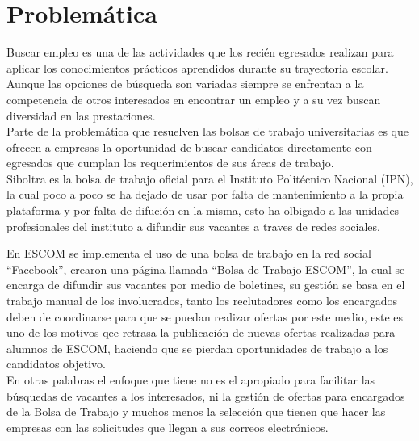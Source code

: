 \clearpage
\section{Problemática}

Buscar empleo es una de las actividades que los recién egresados realizan para aplicar los conocimientos prácticos aprendidos 
durante su trayectoria escolar. Aunque las opciones de búsqueda son variadas siempre se enfrentan a la competencia de otros 
interesados en encontrar un empleo y a su vez buscan diversidad en las prestaciones. \\
Parte de la problemática que resuelven las bolsas de trabajo universitarias es que ofrecen a empresas la oportunidad de buscar 
candidatos directamente con egresados que cumplan los requerimientos de sus áreas de trabajo.\\

\newline
Siboltra es la bolsa de trabajo oficial para el Instituto Politécnico Nacional (IPN), la cual poco a poco se ha dejado de usar
por falta de mantenimiento a la propia plataforma y por falta de difución en la misma, esto ha olbigado a las unidades profesionales
del instituto a difundir sus vacantes a traves de redes sociales.\\
\newline

En ESCOM se implementa el uso de una bolsa de trabajo en la red social ``Facebook'', 
crearon una página llamada ``Bolsa de Trabajo ESCOM'', la cual se encarga de difundir sus vacantes por medio de boletines, su gestión se basa en el trabajo manual de los involucrados, tanto los reclutadores como los encargados deben de coordinarse 
para que se puedan realizar ofertas por este medio, este  es uno de los motivos qee retrasa la publicación de nuevas ofertas 
realizadas para alumnos de ESCOM, haciendo que se pierdan oportunidades de trabajo a los candidatos objetivo.\\
\newline
En otras palabras el enfoque que tiene no es el apropiado para facilitar las búsquedas de  vacantes a los interesados, ni la gestión
de ofertas para encargados de la Bolsa de Trabajo y muchos menos la selección que tienen que hacer las empresas con las solicitudes
que llegan a sus correos electrónicos.